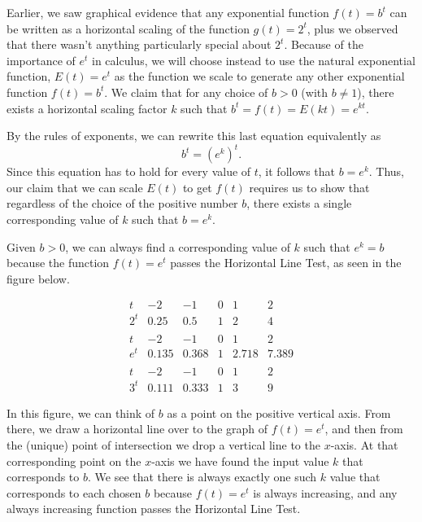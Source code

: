 \documentclass[nooutcomes]{ximera}
\begin{document}

Earlier, we saw graphical evidence that any exponential function $f(t) = b^t$ can be written as a horizontal scaling of the function $g(t) = 2^t$, plus we observed that there wasn't anything particularly special about $2^t$.    Because of the importance of $e^t$ in calculus, we will choose instead to use the natural exponential function, 	$E(t) = e^t$ as the function we scale to generate any other exponential function $f(t) = b^t$.  We claim that for any choice of $b > 0$ (with $b \ne 1$), there exists a horizontal scaling factor $k$ such that $b^t = f(t) = E(kt) = e^{kt}$.

By the rules of exponents, we can rewrite this last equation equivalently as%
\begin{equation*}
b^t = (e^k)^t\text{.}
\end{equation*}
Since this equation has to hold for every value of $t$, it follows that $b = e^k$.  Thus, our claim that we can scale $E(t)$ to get $f(t)$ requires us to show that regardless of the choice of the positive number $b$, there exists a single corresponding value of $k$ such that $b = e^k$.

Given $b > 0$, we can always find a corresponding value of $k$ such that $e^k = b$ because the function $f(t) = e^t$ passes the Horizontal Line Test, as seen in the figure below.


$$
\begin{array}{cccccc}
t&-2&-1&0&1&2\\
\hline
2^t&0.25&0.5&1&2&4\\
&&&&\\
t&-2&-1&0&1&2\\
\hline
e^t&0.135&0.368&1&2.718&7.389\\
&&&&\\
t&-2&-1&0&1&2\\
\hline
3^t&0.111&0.333&1&3&9
\end{array}
$$

In this figure, we can think of $b$ as a point on the positive vertical axis.  From there, we draw a horizontal line over to the graph of $f(t) = e^t$, and then from the (unique) point of intersection we drop a vertical line to the $x$-axis.  At that corresponding point on the $x$-axis we have found the input value $k$ that corresponds to $b$.  We see that there is always exactly one such $k$ value that corresponds to each chosen $b$ because $f(t) = e^t$ is always increasing, and any always increasing function passes the Horizontal Line Test.
\end{document}

